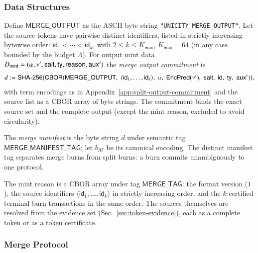 \subsubsection{Data Structures}

Define $\mathsf{MERGE\_OUTPUT}$ as the ASCII byte string \texttt{"UNICITY\_MERGE\_OUTPUT"}. Let the source tokens have pairwise distinct identifiers, listed in strictly increasing bytewise order: $\mathsf{id}_1 < \cdots < \mathsf{id}_k$, with $2 \le k \le K_\mathsf{max}$, $K_\mathsf{max} = 64$ (in any case bounded by the budget $\Lambda$). For output mint data $D_\mathsf{mint} = (\alpha, \nu', \mathsf{salt}, \mathsf{ty}, \mathsf{reason}, \mathsf{aux}')$ the \emph{merge output commitment} is
\[
d := \mathsf{SHA\text{-}256}\bigl(\mathsf{CBOR}(
	\mathsf{MERGE\_OUTPUT},\;
	\langle\mathsf{id}_1,\ldots,\mathsf{id}_k\rangle,\;
	\alpha,\;
	\mathsf{EncPred}(\nu'),\;
	\mathsf{salt},\;
	\mathsf{id},\;
	\mathsf{ty},\;
	\mathsf{aux}'
)\bigr),
\]
with term encodings as in Appendix~\ref{app:split-output-commitment} and the source list as a CBOR array of byte strings. The commitment binds the exact source set and the complete output (except the mint reason, excluded to avoid circularity).

The \emph{merge manifest} is the byte string $d$ under semantic tag $\mathsf{MERGE\_MANIFEST\_TAG}$; let $b_\mathcal{M}$ be its canonical encoding. The distinct manifest tag separates merge burns from split burns: a burn commits unambiguously to one protocol.

The mint reason is a CBOR array under tag $\mathsf{MERGE\_TAG}$: the format version ($1$), the source identifiers $\langle \mathsf{id}_1, \ldots, \mathsf{id}_k\rangle$ in strictly increasing order, and the $k$ certified terminal burn transactions in the same order. The sources themselves are resolved from the evidence set (Sec.~\ref{sec:token-evidence}), each as a complete token or as a token certificate.

\subsubsection{Merge Protocol}

